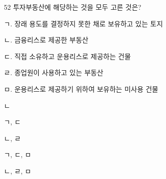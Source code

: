 \begin{question}{52}
투자부동산에 해당하는 것을 모두 고른 것은?
\begin{framedtext}
ㄱ. 장래 용도를 결정하지 못한 채로 보유하고 있는 토지 \par
ㄴ. 금융리스로 제공한 부동산 \par
ㄷ. 직접 소유하고 운용리스로 제공하는 건물 \par
ㄹ. 종업원이 사용하고 있는 부동산 \par
ㅁ. 운용리스로 제공하기 위하여 보유하는 미사용 건물
\end{framedtext}
\begin{choices}
  \item ㄴ
  \item ㄱ, ㄷ
  \item ㄴ, ㄹ
  \item ㄱ, ㄷ, ㅁ
  \item ㄴ, ㄹ, ㅁ
\end{choices}
\end{question}
